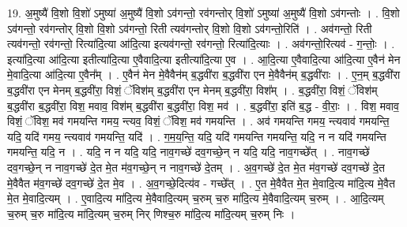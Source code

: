 \documentclass[17pt]{extarticle}
\begin{document}
19. अ॒मुष्यै॑ वि॒शो वि॒शो॑ ऽमुष्या॑ अ॒मुष्यै॑ वि॒शो ऽव॑गन्तो॒ रव॑गन्तोर् वि॒शो॑ ऽमुष्या॑ अ॒मुष्यै॑ वि॒शो ऽव॑गन्तोः । . वि॒शो ऽव॑गन्तो॒ रव॑गन्तोर् वि॒शो वि॒शो ऽव॑गन्तो॒ रिती त्यव॑गन्तोर् वि॒शो वि॒शो ऽव॑गन्तो॒रिति॑ । . अव॑गन्तो॒ रिती त्यव॑गन्तो॒ रव॑गन्तो॒ रित्या॑दि॒त्या आ॑दि॒त्या इत्यव॑गन्तो॒ रव॑गन्तो॒ रित्या॑दि॒त्याः । . अव॑गन्तो॒रित्यव॑ - ग॒न्तोः॒ । . इत्या॑दि॒त्या आ॑दि॒त्या इतीत्या॑दि॒त्या ए॒वैवादि॒त्या इतीत्या॑दि॒त्या ए॒व । . आ॒दि॒त्या ए॒वैवादि॒त्या आ॑दि॒त्या ए॒वैन॑ मेन मे॒वादि॒त्या आ॑दि॒त्या ए॒वैन᳚म् । . ए॒वैन॑ मेन मे॒वैवैन॑म् ब॒द्धवी॑रा ब॒द्धवी॑रा एन मे॒वैवैन॑म् ब॒द्धवी॑राः । . ए॒न॒म् ब॒द्धवी॑रा ब॒द्धवी॑रा एन मेनम् ब॒द्धवी॑रा॒ विशं॒ ॅविश॑म् ब॒द्धवी॑रा एन मेनम् ब॒द्धवी॑रा॒ विश᳚म् । . ब॒द्धवी॑रा॒ विशं॒ ॅविश॑म् ब॒द्धवी॑रा ब॒द्धवी॑रा॒ विश॒ मवाव॒ विश॑म् ब॒द्धवी॑रा ब॒द्धवी॑रा॒ विश॒ मव॑ । . ब॒द्धवी॑रा॒ इति॑ ब॒द्ध - वी॒राः॒ । . विश॒ मवाव॒ विशं॒ ॅविश॒ मव॑ गमयन्ति गमय॒ न्त्यव॒ विशं॒ ॅविश॒ मव॑ गमयन्ति । . अव॑ गमयन्ति गमय॒ न्त्यवाव॑ गमयन्ति॒ यदि॒ यदि॑ गमय॒ न्त्यवाव॑ गमयन्ति॒ यदि॑ । . ग॒म॒य॒न्ति॒ यदि॒ यदि॑ गमयन्ति गमयन्ति॒ यदि॒ न न यदि॑ गमयन्ति गमयन्ति॒ यदि॒ न । . यदि॒ न न यदि॒ यदि॒ नाव॒गच्छे॑ दव॒गच्छे॒न् न यदि॒ यदि॒ नाव॒गच्छे᳚त् । . नाव॒गच्छे॑ दव॒गच्छे॒न् न नाव॒गच्छे॑ दे॒त मे॒त म॑व॒गच्छे॒न् न नाव॒गच्छे॑ दे॒तम् । . अ॒व॒गच्छे॑ दे॒त मे॒त म॑व॒गच्छे॑ दव॒गच्छे॑ दे॒त मे॒वैवैत म॑व॒गच्छे॑ दव॒गच्छे॑ दे॒त मे॒व । . अ॒व॒गच्छे॒दित्य॑व - गच्छे᳚त् । . ए॒त मे॒वैवैत मे॒त मे॒वादि॒त्य मा॑दि॒त्य मे॒वैत मे॒त मे॒वादि॒त्यम् । . ए॒वादि॒त्य मा॑दि॒त्य मे॒वैवादि॒त्यम् च॒रुम् च॒रु मा॑दि॒त्य मे॒वैवादि॒त्यम् च॒रुम् । . आ॒दि॒त्यम् च॒रुम् च॒रु मा॑दि॒त्य मा॑दि॒त्यम् च॒रुम् निर् णिश्च॒रु मा॑दि॒त्य मा॑दि॒त्यम् च॒रुम् निः । \newline
\end{document}
